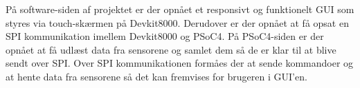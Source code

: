 
På software-siden af projektet er der opnået et responsivt og funktionelt GUI som styres via touch-skærmen på Devkit8000.  Derudover er der opnået at få opsat en SPI kommunikation imellem Devkit8000 og PSoC4. På PSoC4-siden er der opnået at få udlæst data fra sensorene og samlet dem så de er klar til at blive sendt over SPI. Over SPI kommunikationen formåes der at sende kommandoer og at hente data fra sensorene så det kan fremvises for brugeren i GUI'en.